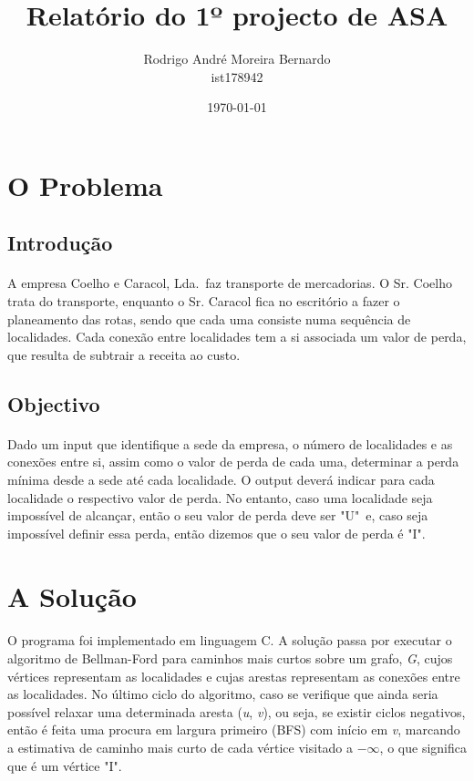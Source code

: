\documentclass[12pt, a4paper]{article}
\title{\textbf{Relatório do 1º projecto de ASA}}
\author{Rodrigo André Moreira Bernardo \\ ist178942}
\affil{Instituto Superior Técnico}
\date{\today}
\begin{document}
\maketitle

\section{O Problema}

\subsection{Introdução}
\paragraph{}
A empresa Coelho e Caracol, Lda.\ faz transporte de mercadorias. O Sr. Coelho
trata do transporte, enquanto o Sr. Caracol fica no escritório a fazer o
planeamento das rotas, sendo que cada uma consiste numa sequência de
localidades. Cada conexão entre localidades tem a si associada um valor de
perda, que resulta de subtrair a receita ao custo.

\subsection{Objectivo}
\paragraph{}
Dado um input que identifique a sede da empresa, o número de localidades e as
conexões entre si, assim como o valor de perda de cada uma, determinar a perda
mínima desde a sede até cada localidade. O output deverá indicar para cada
localidade o respectivo valor de perda. No entanto, caso uma localidade seja
impossível de alcançar, então o seu valor de perda deve ser "U"\ e, caso seja
impossível definir essa perda, então dizemos que o seu valor de perda é "I".

\section{A Solução}
\paragraph{}
O programa foi implementado em linguagem C.  A solução passa por executar o
algoritmo de Bellman-Ford para caminhos mais curtos sobre um grafo, \textit{G},
cujos vértices representam as localidades e cujas arestas representam as
conexões entre as localidades. No último ciclo do algoritmo, caso se verifique
que ainda seria possível relaxar uma determinada aresta (\textit{u},
\textit{v}), ou seja, se existir ciclos negativos, então é feita uma procura em
largura primeiro (BFS) com início em \textit{v}, marcando a estimativa de
caminho mais curto de cada vértice visitado a $-\infty$, o que significa que é
um vértice "I".
\end{document}
